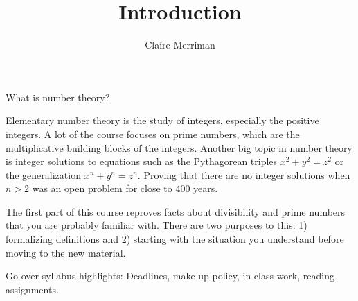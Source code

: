 \documentclass{ximera}
\author{Claire Merriman}
\title{Introduction}
\begin{document}
\begin{abstract}
\end{abstract}
\maketitle


What is number theory?

Elementary number theory is the study of integers, especially the positive integers. A lot of the course focuses on prime numbers, which are the multiplicative building blocks of the integers. Another big topic in number theory is integer solutions to equations such as the Pythagorean triples $x^2+y^2=z^2$ or the generalization $x^n+y^n=z^n$. Proving that there are no integer solutions when $n>2$ was an open problem for close to 400 years.

The first part of this course reproves facts about divisibility and prime numbers that you are probably familiar with. There are two purposes to this: 1) formalizing definitions and 2) starting with the situation you understand before moving to the new material.


\begin{instructorNotes}
  Go over syllabus highlights: Deadlines, make-up policy, in-class work, reading assignments.
\end{instructorNotes}
\end{document}
